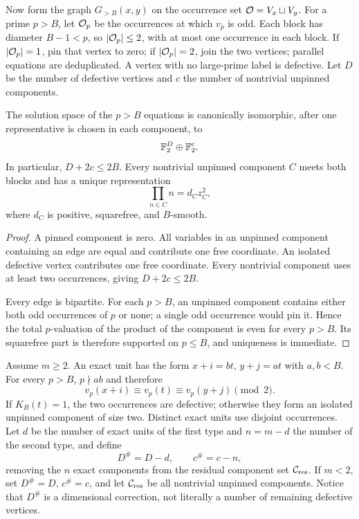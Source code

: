 Now form the graph $G_{>B}(x,y)$ on the occurrence set
$\mathcal O=V_x\sqcup V_y$.  For a prime $p>B$, let $\mathcal O_p$ be the
occurrences at which $v_p$ is odd.  Each block has diameter $B-1<p$,
so $|\mathcal O_p|\leq2$, with at most one occurrence in each block.  If
$|\mathcal O_p|=1$, pin that vertex to zero; if $|\mathcal O_p|=2$, join the two
vertices; parallel equations are deduplicated.  A vertex with no
large-prime label is defective.  Let $D$ be the number of defective
vertices and $c$ the number of nontrivial unpinned components.

\begin{lemma}\label{macro:lem:graph-resolution}
The solution space of the $p>B$ equations is canonically isomorphic,
after one representative is chosen in each component, to
\[
 \mathbb F_2^D\oplus\mathbb F_2^c.
\]
In particular, $D+2c\leq2B$.  Every nontrivial unpinned component
$C$ meets both blocks and has a unique representation
\[
 \prod_{n\in C}n=d_Cz_C^2,
\]
where $d_C$ is positive, squarefree, and $B$-smooth.
\end{lemma}

\begin{proof}
A pinned component is zero.  All variables in an unpinned component
containing an edge are equal and contribute one free coordinate.  An
isolated defective vertex contributes one free coordinate.  Every
nontrivial component uses at least two occurrences, giving
$D+2c\leq2B$.

Every edge is bipartite.  For each $p>B$, an unpinned component
contains either both odd occurrences of $p$ or none; a single odd
occurrence would pin it.  Hence the total $p$-valuation of the product
of the component is even for every $p>B$.  Its squarefree part is
therefore supported on $p\leq B$, and uniqueness is immediate.
\end{proof}

Assume $m\geq2$.  An exact unit has the form
$x+i=bt$, $y+j=at$ with $a,b<B$.
For every $p>B$, $p\nmid ab$ and therefore
\[
 v_p(x+i)\equiv v_p(t)\equiv v_p(y+j)\pmod2.
\]
If $K_B(t)=1$, the two occurrences are defective; otherwise they form
an isolated unpinned component of size two.  Distinct exact units use
disjoint occurrences.  Let $d$ be the number of exact units of the
first type and $n=m-d$ the number of the second type, and define
\[
 D^\#=D-d,
 \qquad c^\#=c-n,
\]
removing the $n$ exact components from the residual component set
$\mathcal C_{\mathrm{res}}$.  If $m<2$, set $D^\#=D$, $c^\#=c$, and let $\mathcal C_{\mathrm{res}}$ be all
nontrivial unpinned components.  Notice that $D^\#$ is a dimensional
correction, not literally a number of remaining defective vertices.


